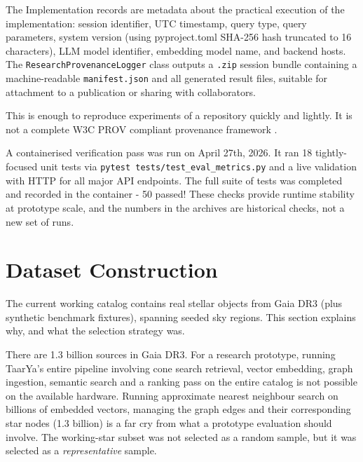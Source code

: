 \documentclass[preprint,12pt,authoryear]{elsarticle}
\begin{document}
The Implementation records are metadata about the practical execution of the implementation: session identifier, UTC timestamp, query type, query parameters, system version (using pyproject.toml SHA-256 hash truncated to 16 characters), LLM model identifier, embedding model name, and backend hosts. The \texttt{ResearchProvenanceLogger} class outputs a \texttt{.zip} session bundle containing a machine-readable \texttt{manifest.json} and all generated result files, suitable for attachment to a publication or sharing with collaborators.

This is enough to reproduce experiments of a repository quickly and lightly. It is not a complete W3C PROV compliant provenance framework \citep{Belhajjame2013}.

A containerised verification pass was run on April 27th, 2026. It ran 18 tightly-focused unit tests via \texttt{pytest tests/test\_eval\_metrics.py} and a live validation with HTTP for all major API endpoints. The full suite of tests was completed and recorded in the container - 50 passed! These checks provide runtime stability at prototype scale, and the numbers in the archives are historical checks, not a new set of runs.

\section{Dataset Construction}
\label{sec:dataset}

The current working catalog contains \nStarsReal{} real stellar objects from Gaia DR3 \citep{Vallenari2023} (plus \nStarsSynthetic{} synthetic benchmark fixtures), spanning \nClusterNodes{} seeded sky regions. This section explains why, and what the selection strategy was.

There are 1.3 billion sources in Gaia DR3. For a research prototype, running \textsf{TaarYa}'s entire pipeline involving cone search retrieval, vector embedding, graph ingestion, semantic search and a ranking pass on the entire catalog is not possible on the available hardware. Running approximate nearest neighbour search on billions of embedded vectors, managing the graph edges and their corresponding star nodes (1.3 billion) is a far cry from what a prototype evaluation should involve. The working-star subset was not selected as a random sample, but it was selected as a \emph{representative} sample.
\end{document}
